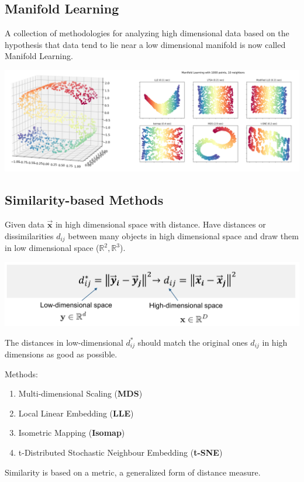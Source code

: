 \documentclass[11pt]{article}
\theoremstyle{definition}
\newcommand*\R{\mathbb{R}}
\begin{document}
\subsection{Manifold Learning}
A collection of methodologies for analyzing high dimensional data based on the hypothesis that data tend to lie near a low dimensional manifold is now called Manifold Learning.

\begin{center}
	\includegraphics[width=0.8\linewidth]{img/manifold_learning}
\end{center}

\subsection{Similarity-based Methods}
Given data $\vec{\textbf{x}}$ in high dimensional space with distance. Have distances or dissimilarities $d_{ij}$ between many objects in high dimensional space and draw them in low dimensional space ($\R^2,\R^3$).
\begin{center}
	\includegraphics[width=0.8\linewidth]{img/similarity_methods}
\end{center}
The distances in low-dimensional $d_{ij}^*$ should match the original ones $d_{ij}$ in high dimensions as good as possible.

Methods:
\begin{enumerate}
	\item Multi-dimensional Scaling (\textbf{MDS})
	\item Local Linear Embedding (\textbf{LLE})
	\item Isometric Mapping (\textbf{Isomap})
	\item t-Distributed Stochastic Neighbour Embedding (\textbf{t-SNE})
\end{enumerate}
Similarity is based on a metric, a generalized form of distance measure.
\end{document}
